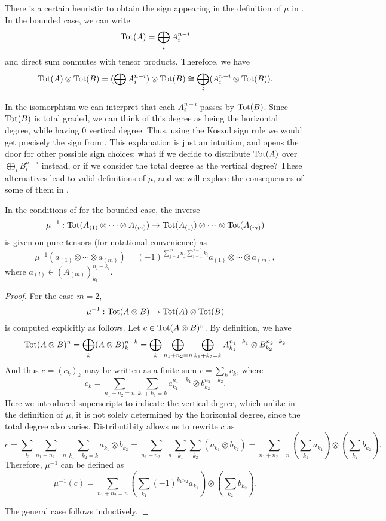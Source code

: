 \documentclass[twoside]{article}
\begin{document}
\begin{remark}\label{heuristic}
There is a certain heuristic to obtain the sign appearing in the definition of $\mu$ in . In the bounded case, we can write \[\mathrm{Tot}(A)=\bigoplus_i A_i^{n-i}\]
and direct sum conmutes with tensor products. Therefore, we have
\[\mathrm{Tot}(A)\otimes\mathrm{Tot}(B)=(\bigoplus A_i^{n-i})\otimes \mathrm{Tot}(B)\cong \bigoplus_i  (A_i^{n-i}\otimes \mathrm{Tot}(B)).\]

In the isomorphism we can interpret that each $A_i^{n-i}$ passes by $\mathrm{Tot}(B)$. Since $\mathrm{Tot}(B)$ is total graded, we can think of this degree as being the horizontal degree, while having 0 vertical degree. Thus, using the Koszul sign rule we would get precisely the sign from . This explanation is just an intuition, and opens the door for other possible sign choices: what if we decide to distribute $\mathrm{Tot}(A)$ over $\bigoplus_i B_i^{n-i}$ instead, or if we consider the total degree as the vertical degree? These alternatives lead to valid definitions of $\mu$, and we will explore the consequences of some of them in .
\end{remark}

\begin{lem}\label{mui}
In the conditions of  for the bounded case, the inverse
\[\mu^{-1}:\mathrm{Tot}(A_{(1)}\otimes\cdots\otimes A_{(m)})\to \mathrm{Tot}(A_{(1)})\otimes\cdots\otimes \mathrm{Tot}(A_{(m)})\]
is given on pure tensors (for notational convenience) as
\begin{equation}\label{mu}
\mu^{-1}(a_{(1)}\otimes\cdots\otimes a_{(m)})=(-1)^{\sum_{j=2}^m n_j\sum_{i=1}^{j-1}k_i}a_{(1)}\otimes\cdots\otimes a_{(m)},
\end{equation}
where $a_{(l)}\in (A_{(m)})_{k_l}^{n_l-k_l}$.
\end{lem}
\begin{proof}
For the case $m=2$,
\[\mu^{-1}:\mathrm{Tot}(A\otimes B)\to \mathrm{Tot}(A)\otimes \mathrm{Tot}(B)\]
is computed explicitly as follows.
Let  $c\in\mathrm{Tot}(A\otimes B)^n$. By definition, we have
\[\mathrm{Tot}(A\otimes B)^n=\bigoplus_k (A\otimes B)^{n-k}_k=\bigoplus_k\bigoplus_{n_1+n_2=n}\bigoplus_{k_1+k_2=k}A_{k_1}^{n_1-k_1}\otimes B_{k_2}^{n_2-k_2}\]
And thus $c=(c_k)_k$ may be written as a finite sum $c=\sum_k c_k$, where 
\[c_k=\sum_{n_1+n_2=n}\sum_{k_1+k_2=k}a_{k_1}^{n_1-k_1}\otimes b_{k_2}^{n_2-k_2}.\]
Here we introduced superscripts to indicate the vertical degree, which unlike in the definition of $\mu$, it is not solely determined by the horizontal degree, since the total degree also varies. Distributibity allows us to rewrite $c$ as
\[c=\sum_k \sum_{n_1+n_2=n}\sum_{k_1+k_2=k}a_{k_1}\otimes b_{k_2}=\sum_{n_1+n_2=n}\sum_{k_1}\sum_{k_2}(a_{k_1}\otimes b_{k_2})=\sum_{n_1+n_2=n}\left(\sum_{k_1}a_{k_1}\right)\otimes\left(\sum_{k_2}b_{k_2}\right).\]
Therefore, $\mu^{-1}$ can be defined as
\[\mu^{-1}(c)=\sum_{n_1+n_2=n}\left(\sum_{k_1}(-1)^{k_1n_2}a_{k_1}\right)\otimes\left(\sum_{k_2}b_{k_2}\right).\]

The general case follows inductively.
\end{proof}
\end{document}
